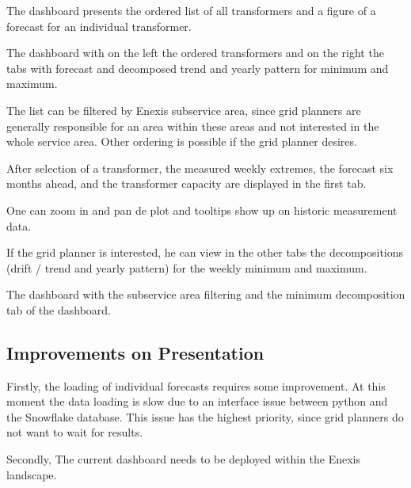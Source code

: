\documentclass[letterpaper,10pt,english]{sphinxmanual}
\let\sphinxpxdimen\pdfpxdimen\else\newdimen\sphinxpxdimen
\begin{document}
The dashboard presents the ordered list of all transformers and a figure of a forecast for an individual transformer.
\begin{quote}

\noindent{\hspace*{\fill}\sphinxincludegraphics[width=800\sphinxpxdimen]{{dashboard}.png}\hspace*{\fill}}
\end{quote}

The dashboard with on the left the ordered transformers and on the right the tabs with forecast and decomposed trend and yearly pattern for minimum and maximum.

The list can be filtered by Enexis sub\sphinxhyphen{}service area, since grid planners are generally responsible for an area within these areas and not interested in the whole service area.
Other ordering is possible if the grid planner desires.

After selection of a transformer, the measured weekly extremes, the forecast six months ahead, and the transformer capacity are displayed in the first tab.

One can zoom in and pan de plot and tooltips show up on historic measurement data.

If the grid planner is interested, he can view in the other tabs the decompositions (drift / trend and yearly pattern) for the weekly minimum and maximum.
\begin{quote}

\noindent{\hspace*{\fill}\sphinxincludegraphics[width=800\sphinxpxdimen]{{dashboard_min}.png}\hspace*{\fill}}
\end{quote}

The dashboard with the sub\sphinxhyphen{}service area filtering and the minimum decomposition tab of the dashboard.


\subsection{Improvements on Presentation}
\label{\detokenize{evaluation:improvements-on-presentation}}
Firstly, the loading of individual forecasts requires some improvement. At this moment the data loading is slow due to an interface issue between python and the Snowflake database.
This issue has the highest priority, since grid planners do not want to wait for results.

Secondly, The current dashboard needs to be deployed within the Enexis landscape.
\end{document}
